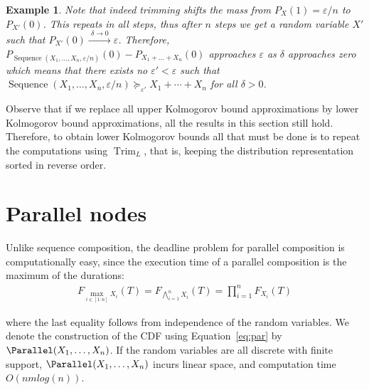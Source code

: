 \documentclass[review]{elsarticle}
\newtheorem{example}{Example}
\DeclareMathOperator{\Trim}{Trim}
\DeclareMathOperator{\Sequence}{Sequence}
\begin{document}
\begin{example}
	Note that indeed trimming shifts the mass from $P_X(1)=\varepsilon/n$ to $P_{X'}(0)$.
	This repeats in all steps, thus after $n$ steps we get a random variable $X'$ such that $P_{X'}(0) \xrightarrow{\,\,\delta \to 0\,\,} \varepsilon$. Therefore, 
	$P_{\Sequence(X_1,\dots,X_n,\varepsilon/n)}(0) {-} P_{X_1{+}\dots{+}X_n}(0)$
	approaches $\varepsilon$ as $\delta$ approaches zero
	which means that there exists no $\varepsilon' {<} \varepsilon$
	such that $\Sequence(X_1,\dots,X_n,\varepsilon/n) \succeq_{\varepsilon'} X_1 + \cdots + X_n$ for all $\delta >0$.
	
\end{example}

Observe that if we replace all upper Kolmogorov bound approximations by 
lower Kolmogorov bound approximations, all the results in this section
still hold. Therefore, to obtain lower Kolmogorov bounds all that must be
done is to repeat the computations using $\Trim_L$, that is, keeping
the distribution representation sorted in reverse order.


\section{Parallel nodes}\label{sec:par}


Unlike sequence composition, the deadline problem for parallel composition
is computationally easy, since the execution time of
a parallel composition is the maximum of the durations:
\begin{align}
F_{\max_{i\in[1:n]}X_i}(T)
{=}F_{\bigwedge_{i=1}^n X_i}(T) 
{=}\prod_{i=1}^n F_{X_i} (T)
\label{eq:par}
\end{align}

\noindent where the last equality follows from independence of the random variables.
We denote the construction of the CDF using Equation~\eqref{eq:par} by $\Parallel(X_1,\dots , X_n)$.
If the random variables  are all discrete with finite support, $\Parallel(X_1,\dots , X_n)$
incurs linear space, and computation time $O(nm log(n))$.
\end{document}
